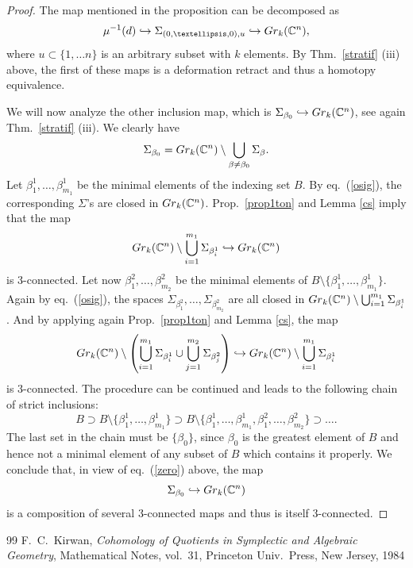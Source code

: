 \documentclass[10pt,a4paper]{amsart}
\newcommand{\CC}{\mathbb C}
\begin{document}
\begin{proof}
The map mentioned in the proposition can be decomposed as 
$$\mu^{-1}(d) \hookrightarrow \Sigma_{(0,\ldots, 0),u} \hookrightarrow {\rm Gr}_k(\CC^n),$$
where $u\subset \{1, \ldots n\}$ is an arbitrary subset with $k$ elements. 
By Thm.~\ref{stratif} (iii) above, the first of these maps is a deformation retract and thus a homotopy equivalence.

We will now analyze the other inclusion map, which is $\Sigma_{\beta_0}\hookrightarrow  {\rm Gr}_k(\CC^n)$, see again
Thm.~\ref{stratif} (iii). We clearly have
\begin{equation}\label{zero}\Sigma_{\beta_0} = {\rm Gr}_k(\CC^n)\setminus \bigcup_{\beta \neq \beta_0} \Sigma_\beta.\end{equation}
Let $\beta^1_1, \ldots, \beta^1_{m_1}$ be the minimal elements of the indexing set $B$. By eq.~(\ref{osig}), the corresponding
$\Sigma$'s are closed in ${\rm Gr}_k(\CC^n)$. Prop.~\ref{prop1ton} and Lemma \ref{cs} imply that the map
$${\rm Gr}_k(\CC^n) \setminus \bigcup_{i=1}^{m_1}\Sigma_{\beta_i^1}\hookrightarrow {\rm Gr}_k(\CC^n) $$
is 3-connected. Let now $\beta^2_1, \ldots, \beta^2_{m_2}$ be the minimal elements of 
$B\setminus \{\beta^1_1, \ldots, \beta^1_{m_1}\}$. Again by eq.~(\ref{osig}), the spaces $\Sigma_{\beta_1^2}, \ldots, 
\Sigma_{\beta_{m_2}^2}$ are all closed in ${\rm Gr}_k(\CC^n) \setminus \bigcup_{i=1}^{m_1}\Sigma_{\beta_i^1}$. 
And by applying again Prop.~\ref{prop1ton} and Lemma \ref{cs}, the map
 $${\rm Gr}_k(\CC^n) \setminus \left(\bigcup_{i=1}^{m_1}\Sigma_{\beta_i^1}\cup \bigcup_{j=1}^{m_2}\Sigma_{\beta_j^2}\right)\hookrightarrow {\rm Gr}_k(\CC^n) \setminus \bigcup_{i=1}^{m_1}\Sigma_{\beta_i^1}$$
 is $3$-connected. The procedure can be continued and leads to the following chain of strict inclusions:
 $$B\supset B\setminus \{\beta_1^1, \ldots, \beta_{m_1}^1\}\supset B\setminus \{\beta_1^1, \ldots, \beta_{m_1}^1,
 \beta_1^2,\ldots, \beta_{m_2}^2\} \supset \ldots .$$
 The last set in the chain must be $\{\beta_0\}$, since $\beta_0$ is the greatest element of $B$ and hence not a minimal element of any subset of $B$ which contains it properly. 
We conclude that, in view of eq.~(\ref{zero}) above, the map
 $$\Sigma_{\beta_0} \hookrightarrow  {\rm Gr}_k(\CC^n) $$
 is a composition of several 3-connected maps and thus is itself 3-connected. 
\end{proof}

\begin{thebibliography}{99}
 F.~C.~Kirwan, {\it Cohomology of Quotients in Symplectic and Algebraic Geometry}, Mathematical Notes, vol.~31, Princeton Univ.~Press, New Jersey, 1984
\end{thebibliography}
\end{document}
